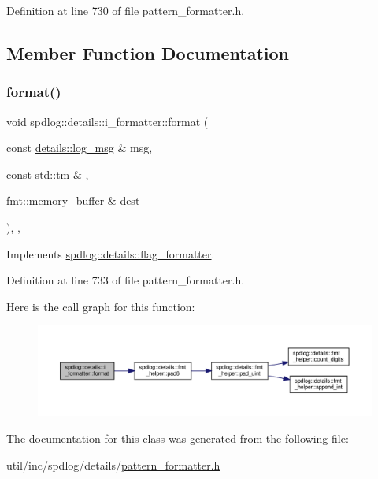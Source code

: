Definition at line 730 of file pattern\+\_\+formatter.\+h.



\subsection{Member Function Documentation}
\mbox{\label{classspdlog_1_1details_1_1i__formatter_aacaecd1c3fd6827287055d2f607f10ed}} 
\subsubsection{\texorpdfstring{format()}{format()}}
{\footnotesize\ttfamily void spdlog\+::details\+::i\+\_\+formatter\+::format (\begin{DoxyParamCaption}\item[{const \hyperlink{structspdlog_1_1details_1_1log__msg}{details\+::log\+\_\+msg} \&}]{msg,  }\item[{const std\+::tm \&}]{,  }\item[{\hyperlink{format_8h_a21cbf729f69302f578e6db21c5e9e0d2}{fmt\+::memory\+\_\+buffer} \&}]{dest }\end{DoxyParamCaption})\hspace{0.3cm}{\ttfamily [inline]}, {\ttfamily [override]}, {\ttfamily [virtual]}}



Implements \hyperlink{classspdlog_1_1details_1_1flag__formatter_a33fb3e42a4c8200cceb833d92b53fb67}{spdlog\+::details\+::flag\+\_\+formatter}.



Definition at line 733 of file pattern\+\_\+formatter.\+h.

Here is the call graph for this function\+:
\nopagebreak
\begin{figure}[H]
\begin{center}
\leavevmode
\includegraphics[width=350pt]{classspdlog_1_1details_1_1i__formatter_aacaecd1c3fd6827287055d2f607f10ed_cgraph}
\end{center}
\end{figure}


The documentation for this class was generated from the following file\+:\begin{DoxyCompactItemize}
\item 
util/inc/spdlog/details/\hyperlink{pattern__formatter_8h}{pattern\+\_\+formatter.\+h}\end{DoxyCompactItemize}
